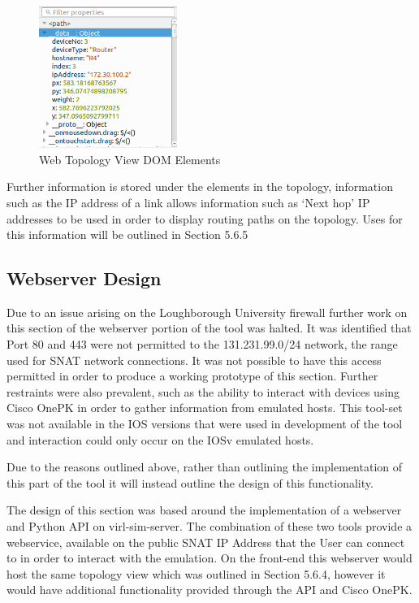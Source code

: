 \documentclass[11pt]{report}
\begin{document}
\begin{figure}[!]
	\caption{Web Topology View DOM Elements}
	\centering
	\includegraphics[width=0.4\textwidth]{topologyWebDOM.png}
\end{figure}

Further information is stored under the elements in the topology, information such as the IP address of a link allows information such as `Next hop' IP addresses to be used in order to display routing paths on the topology. Uses for this information will be outlined in Section 5.6.5

\subsection{Webserver Design}

Due to an issue arising on the Loughborough University firewall further work on this section of the webserver portion of the tool was halted. It was identified that Port 80 and 443 were not permitted to the 131.231.99.0/24 network, the range used for SNAT network connections. It was not possible to have this access permitted in order to produce a working prototype of this section. Further restraints were also prevalent, such as the ability to interact with devices using Cisco OnePK in order to gather information from emulated hosts. This tool-set was not available in the IOS versions that were used in development of the tool and interaction could only occur on the IOSv emulated hosts.

Due to the reasons outlined above, rather than outlining the implementation of this part of the tool it will instead outline the design of this functionality.

The design of this section was based around the implementation of a webserver and Python API on virl-sim-server. The combination of these two tools provide a webservice, available on the public SNAT IP Address that the User can connect to in order to interact with the emulation. On the front-end this webserver would host the same topology view which was outlined in Section 5.6.4, however it would have additional functionality provided through the API and Cisco OnePK.
\end{document}
